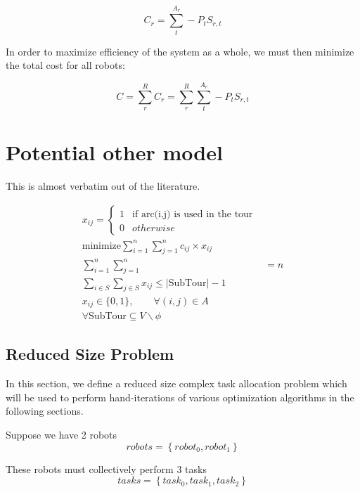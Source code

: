 \documentclass[a4paper]{article}
\begin{document}
$$C_r = \sum_t^{A_r} -P_t S_{r,t}$$

In order to maximize efficiency of the system as a whole, we must then minimize the total cost for all robots:

$$C = \sum_r^{R} C_r = \sum_r^{R} \sum_t^{A_r} -P_t S_{r,t}$$

\section{Potential other model}

This is almost verbatim out of the literature.

\begin{align}
x_{ij} = \begin{cases}
      1 & \text{if arc(i,j) is used in the tour} \\
      0 & otherwise
   \end{cases} \\
\text{minimize} \sum_{i=1}^n \sum_{j=1}^n c_{ij} \times x_{ij} \\
\sum_{i=1}^n \sum_{j=1}^n &= n \\
\sum_{i \in S} \sum_{j \in S} x_{ij} \le |\text{SubTour}| - 1 \\
x_{ij} \in \{0, 1\},\qquad \forall (i, j) \in A \\
\forall \text{SubTour} \subseteq V \backslash \phi
\end{align}
\subsection{Reduced Size Problem}



In this section, we define a reduced size complex task allocation problem which
will be used to perform hand-iterations of various optimization algorithms in
the following sections.

Suppose we have 2 robots
$$\mathit{robots} = \left\{ \mathit{robot}_0, \mathit{robot}_1 \right\}$$

These robots must collectively perform 3 tasks
$$\mathit{tasks} = \left\{ \mathit{task}_0, \mathit{task}_1,  \mathit{task}_2 \right\}$$
\end{document}
